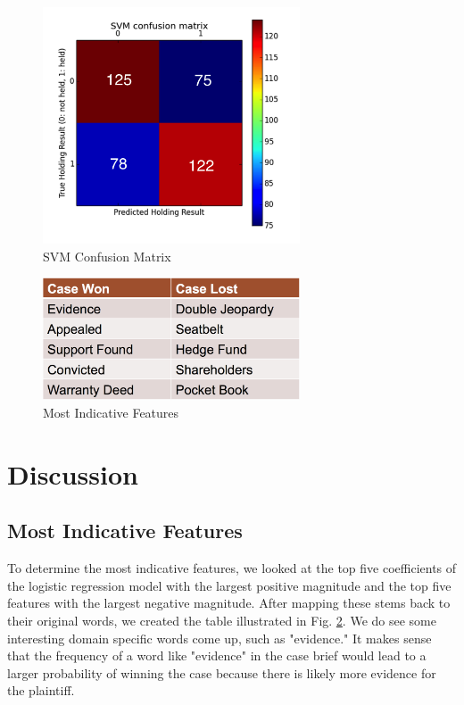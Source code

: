 \documentclass[journal]{IEEEtran}
\begin{document}
\begin{figure}
    \centering
    \includegraphics[width=3in]{svmConfusion.png}
    \caption{SVM Confusion Matrix}
    \label{fig:SVM}
\end{figure}

\begin{figure}
    \centering
    \includegraphics[width=3in]{mostIndicativeFeatures.png}
    \caption{Most Indicative Features}
    \label{fig:msf}
\end{figure}

\section{Discussion}

\subsection{Most Indicative Features}

To determine the most indicative features, we looked at the top five coefficients of the logistic regression model with the largest positive magnitude and the top five features with the largest negative magnitude. After mapping these stems back to their original words, we created the table illustrated in Fig. \ref{fig:msf}. We do see some interesting domain specific words come up, such as "evidence." It makes sense that the frequency of a word like "evidence" in the case brief would lead to a larger probability of winning the case because there is likely more evidence for the plaintiff. 
\end{document}
